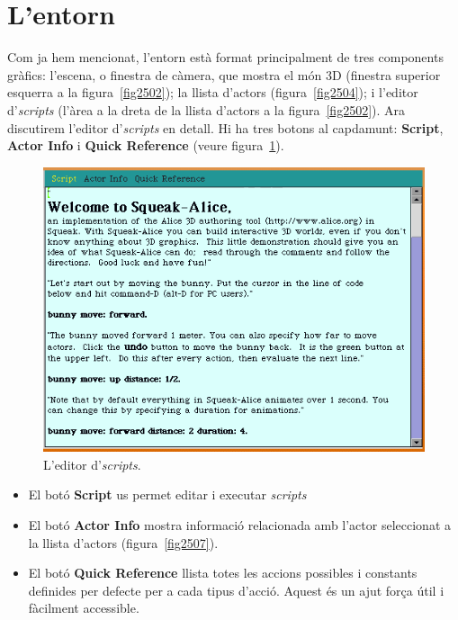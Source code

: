 \section{L'entorn}
Com ja hem mencionat, l'entorn està format principalment de tres components gràfics: l'escena, o finestra de càmera, que mostra el món 3D (finestra superior esquerra a la figura~\ref{fig2502}); la llista d'actors (figura~\ref{fig2504}); i l'editor d'\emph{scripts} (l'àrea a la dreta de la llista d'actors a la figura~\ref{fig2502}). Ara discutirem l'editor d'\emph{scripts} en detall. Hi ha tres botons al capdamunt: \textbf{Script}, \textbf{Actor Info} i \textbf{Quick Reference} (veure figura~\ref{fig2506}).
\begin{figure}[h!]
\begin{center}
\includegraphics[scale=0.5]{Imatges/figura25-6}
\end{center}
\caption{L'editor d'\emph{scripts}.}
\label{fig2506}
\end{figure}
\begin{itemize}
\item El botó \textbf{Script} us permet editar i executar \emph{scripts}
\item El botó \textbf{Actor Info} mostra informació relacionada amb l'actor seleccionat a la llista d'actors (figura~\ref{fig2507}).
\item El botó \textbf{Quick Reference} llista totes les accions possibles i constants definides per defecte per a cada tipus d'acció. Aquest és un ajut força útil i fàcilment accessible. 
\end{itemize}

